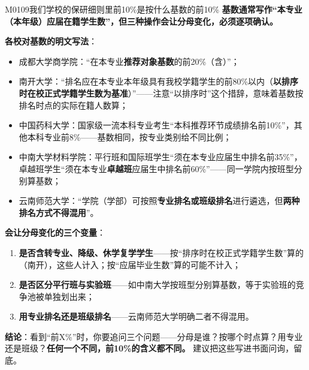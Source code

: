 \begin{qa}{M0109}{我们学校的保研细则里前10\%是按什么基数的前10\%}
\textbf{基数通常写作“本专业（本年级）应届在籍学生数”，但三种操作会让分母变化，必须逐项确认。}

\textbf{各校对基数的明文写法}：

\begin{itemize}
  \item 成都大学商学院：“在本专业\textbf{推荐对象基数}的前20\%（含）”；
  \item 南开大学：“排名应在本专业本年级具有我校学籍学生的前80\%以内（\textbf{以排序时在校正式学籍学生数为基准}）”——注意“以排序时”这个措辞，意味着基数按排名时点的实际在籍人数算；
  \item 中国药科大学：国家级一流本科专业考生“本科推荐环节成绩排名前10\%”，其他本科专业前8\%——基数相同，按专业类别给不同比例；
  \item 中南大学材料学院：平行班和国际班学生“须在本专业应届生中排名前35\%”，卓越班学生“须在本专业\textbf{卓越班}应届生中排名前60\%”——同一学院内按班型分别算基数；
  \item 云南师范大学：“学院（学部）可按照\textbf{专业排名或班级排名}进行遴选，但\textbf{两种排名方式不得混用}”。
\end{itemize}

\textbf{会让分母变化的三个变量}：
\begin{enumerate}
  \item \textbf{是否含转专业、降级、休学复学学生}——按“排序时在校正式学籍学生数”算的（南开），这些人计入；按“应届毕业生数”算的可能不计入；
  \item \textbf{是否区分平行班与实验班}——如中南大学按班型分别算基数，等于实验班的竞争池被单独划出来；
  \item \textbf{用专业排名还是班级排名}——云南师范大学明确二者不得混用。
\end{enumerate}

\textbf{结论}：看到“前X\%”时，你要追问三个问题——分母是谁？按哪个时点算？用专业还是班级？\textbf{任何一个不同，前10\%的含义都不同。} 建议把这些写进书面问询，留底。
\end{qa}

